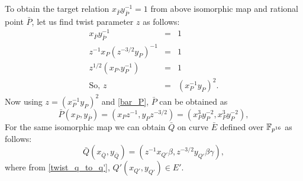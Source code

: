 To obtain the target relation $x_{\bar P}y_{\bar P}^{-1} = 1$ from  above isomorphic map and rational point $\bar P$, let us find twist parameter $z$ as follows:
\begin{eqnarray}
x_{\bar P}y_{\bar P}^{-1}& =& 1 \nonumber \\
z^{-1}x_P (z^{-3/2}y_P)^{-1} &=& 1 \nonumber \\
z^{1/2}(x_P.y_P^{-1})&=&1\nonumber \\
\text{So, } z &= &(x_P^{-1}y_P)^2.
\end{eqnarray}
Now using $z = (x_P^{-1}y_P)^2$ and \eqref{bar_P}, $\bar P$ can be obtained as
\begin{equation}
\bar{P}(x_{\bar{P}}, y_{\bar{P}})= (x_P z^{-1},y_P z^{-3/2})=(x_P^3y_P^{-2},x_P^3y_P^{-2}),
\end{equation}
For the same isomorphic map we can obtain $\bar{Q}$ on curve $\bar{E}$ defined over $\mathbb{F}_{p^{16}}$ as follows:
\begin{equation} \label{Q_bar}
\bar{Q}(x_{\bar{Q}}, y_{\bar{Q}}) = (z^{-1}x_{Q'}\beta, z^{-3/2}y_{Q'}\beta\gamma),
\end{equation} 
where from \eqref{twist_q_to_q'}, $Q'(x_{Q'},y_{Q'}) \in E'$.%

